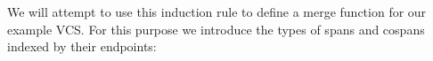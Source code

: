 We will attempt to use this induction rule to define a merge function for our
example VCS. For this purpose we introduce the types of spans and cospans
indexed by their endpoints:
\begin{code}%
%
\>[2]\AgdaSpace{}%
\AgdaSymbol{:}\AgdaSpace{}%
\AgdaSpace{}%
\AgdaSpace{}%
\AgdaSpace{}%
\AgdaSpace{}%
\<%
\\
%
\>[2]\AgdaSpace{}%
\AgdaSpace{}%
\AgdaSpace{}%
\AgdaSymbol{=}\AgdaSpace{}%
\AgdaFunction{Σ[}\AgdaSpace{}%
\AgdaSpace{}%
\AgdaSpace{}%
\AgdaSpace{}%
\AgdaFunction{]}\AgdaSpace{}%
\AgdaSymbol{(}\AgdaSpace{}%
\AgdaOperator{\AgdaInductiveConstructor{[}}\AgdaSpace{}%
\AgdaSpace{}%
\AgdaOperator{\AgdaInductiveConstructor{]}}\AgdaSpace{}%
\AgdaSpace{}%
\AgdaOperator{\AgdaInductiveConstructor{[}}\AgdaSpace{}%
\AgdaSpace{}%
\AgdaOperator{\AgdaInductiveConstructor{]}}\AgdaSpace{}%
\AgdaSymbol{)}\AgdaSpace{}%
\AgdaSpace{}%
\AgdaSymbol{(}\AgdaOperator{\AgdaInductiveConstructor{[}}\AgdaSpace{}%
\AgdaSpace{}%
\AgdaOperator{\AgdaInductiveConstructor{]}}\AgdaSpace{}%
\AgdaSpace{}%
\AgdaOperator{\AgdaInductiveConstructor{[}}\AgdaSpace{}%
\AgdaSpace{}%
\AgdaOperator{\AgdaInductiveConstructor{]}}\AgdaSymbol{)}\<%
\\
%
\\[\AgdaEmptyExtraSkip]%
%
\>[2]\AgdaSpace{}%
\AgdaSymbol{:}\AgdaSpace{}%
\AgdaSpace{}%
\AgdaSpace{}%
\AgdaSpace{}%
\AgdaSpace{}%
\<%
\\
%
\>[2]\AgdaSpace{}%
\AgdaSpace{}%
\AgdaSpace{}%
\AgdaSymbol{=}\AgdaSpace{}%
\AgdaFunction{Σ[}\AgdaSpace{}%
\AgdaSpace{}%
\AgdaSpace{}%
\AgdaSpace{}%
\AgdaFunction{]}\AgdaSpace{}%
\AgdaSymbol{(}\AgdaOperator{\AgdaInductiveConstructor{[}}\AgdaSpace{}%
\AgdaSpace{}%
\AgdaOperator{\AgdaInductiveConstructor{]}}\AgdaSpace{}%
\AgdaSpace{}%
\AgdaOperator{\AgdaInductiveConstructor{[}}\AgdaSpace{}%
\AgdaSpace{}%
\AgdaOperator{\AgdaInductiveConstructor{]}}\AgdaSymbol{)}\AgdaSpace{}%
\AgdaSpace{}%
\AgdaSymbol{(}\AgdaOperator{\AgdaInductiveConstructor{[}}\AgdaSpace{}%
\AgdaSpace{}%
\AgdaOperator{\AgdaInductiveConstructor{]}}\AgdaSpace{}%
\AgdaSpace{}%
\AgdaOperator{\AgdaInductiveConstructor{[}}\AgdaSpace{}%
\AgdaSpace{}%
\AgdaOperator{\AgdaInductiveConstructor{]}}\AgdaSymbol{)}\<%
\end{code}
